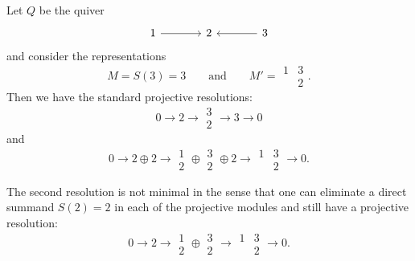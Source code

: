 \documentclass[11pt, a4paper]{report}
\begin{document}
    \begin{example}
    Let $Q$ be the quiver
    \[
    \begin{tikzcd}[ampersand replacement=\&, column sep=large]
    1 \arrow[r] \& 2 \& 3 \arrow[l]
    \end{tikzcd}
    \]
    and consider the representations
    \[
    M=S(3)=3
    \qquad\text{and}\qquad
    M'=
    \begin{matrix}
    1 & 3\\
    & 2
    \end{matrix}.
    \]
    Then we have the standard projective resolutions:
    \[
    0 \longrightarrow 2 \longrightarrow \begin{matrix} 3 \\ 2 \end{matrix} \longrightarrow 3 \longrightarrow 0
    \]
    and
    \[
    0 \longrightarrow 2 \oplus 2
    \longrightarrow \begin{matrix} 1 \\ 2 \end{matrix}\oplus \begin{matrix} 3 \\ 2 \end{matrix}\oplus 2
    \longrightarrow
    \begin{matrix}
    1 & 3\\
    & 2
    \end{matrix}
    \longrightarrow 0.
    \]

    The second resolution is not minimal in the sense that one can eliminate a direct
    summand $S(2)=2$ in each of the projective modules and still have a projective
    resolution:
    \[
    0 \longrightarrow 2
    \longrightarrow \begin{matrix} 1 \\ 2 \end{matrix}\oplus \begin{matrix} 3 \\ 2 \end{matrix}
    \longrightarrow
    \begin{matrix}
    1 & 3\\
    & 2
    \end{matrix}
    \longrightarrow 0.
    \]
    \end{example}
\end{document}
